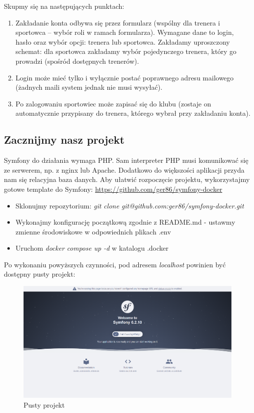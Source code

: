 \documentclass[polish, a4paper]{article}
\begin{document}
Skupmy się na następujących punktach:

\begin{enumerate}
\item{Zakładanie konta odbywa się przez formularz (wspólny dla trenera i sportowca – wybór roli w ramach
formularza). Wymagane dane to login, hasło oraz wybór opcji: trenera lub sportowca. Zakładamy
uproszczony schemat: dla sportowca zakładamy wybór pojedynczego trenera, który go prowadzi
(spośród dostępnych trenerów).}
\item{Login może mieć tylko i wyłącznie postać poprawnego adresu mailowego (żadnych maili system
jednak nie musi wysyłać).}
\item{Po zalogowaniu sportowiec może zapisać się do klubu (zostaje on automatycznie przypisany do
trenera, którego wybrał przy zakładaniu konta).}
\end{enumerate}

\subsection{Zacznijmy nasz projekt}

Symfony do działania wymaga PHP. Sam interpreter PHP musi komunikować się ze serwerem, np. z nginx lub Apache. Dodatkowo do większości aplikacji przyda nam się relacyjna baza danych. Aby ułatwić rozpoczęcie projektu, wykorzystajmy gotowe template do Symfony: \href{https://github.com/ger86/symfony-docker}{https://github.com/ger86/symfony-docker}

\begin{itemize}
    \item{Sklonujmy repozytorium: \emph{git clone git@github.com:ger86/symfony-docker.git}}
    \item{Wykonajmy konfigurację początkową zgodnie z README.md - ustawmy zmienne środowiskowe w odpowiednich plikach .env}
    \item{Uruchom \emph{docker compose up -d} w katalogu .docker}
\end{itemize}

Po wykonaniu powyższych czynności, pod adresem \emph{localhost} powinien być dostępny pusty projekt:

\begin{figure}[H]
  \centering
  \includegraphics[width=\textwidth]{puste.png}
  \caption{Pusty projekt}
\end{figure}
\end{document}
